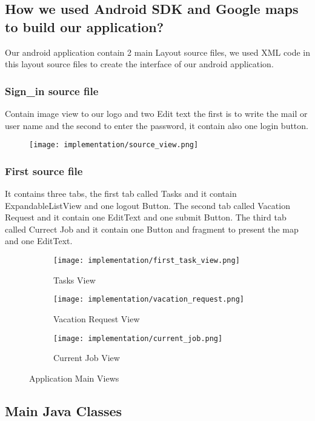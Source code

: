\subsection[Mobile implementation]{How we used Android SDK and Google maps to build our application?}
	Our android application contain 2 main Layout source files, we used XML code in this layout source files to create the interface of our android application.
	
	\subsubsection{Sign\_in source file}
		Contain image view to our logo and two Edit text the first is to write the mail or user name and the second to enter the password, it contain also one login button.
		\begin{figure}[ht]
			\centering
			\texttt{[image: implementation/source\_view.png]}
		\end{figure}
	\subsubsection{First source file}
		It contains three tabs, the first tab called Tasks and it contain ExpandableListView and one logout Button. The second tab called Vacation Request and it contain one EditText and one submit Button. The third tab called Currect Job and it contain one Button and fragment to present the map and one EditText.
		\begin{figure}[ht]
			\centering
			\begin{subfigure}[b]{0.3\textwidth}
				\centering
				\texttt{[image: implementation/first\_task\_view.png]}
				\caption{Tasks View}
			\end{subfigure}
			\hfill
			\begin{subfigure}[b]{0.3\textwidth}
				\centering
				\texttt{[image: implementation/vacation\_request.png]}
				\caption{Vacation Request View}
			\end{subfigure}
			\hfill
			\begin{subfigure}[b]{0.3\textwidth}
				\centering
				\texttt{[image: implementation/current\_job.png]}
				\caption{Current Job View}
			\end{subfigure}
			\hfill
			\caption{Application Main Views}
		\end{figure}
\subsection{Main Java Classes}
